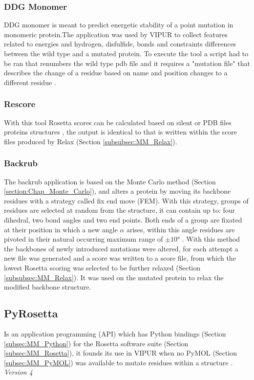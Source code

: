 \subsubsection{DDG Monomer}
DDG monomer is meant to predict energetic stability of a point mutation in  monomeric protein.The application was used by VIPUR to collect features related to energies and hydrogen, disfulfide, bonds and constraints differences between the wild type and a mutated protein. To execute the tool a script had to be ran that renumbers the wild type pdb file and it requires a "mutation file" that describes the change of a residue based on name and position changes to a different residue \cite{}.
\label{subsubsec:MM_DDG_Monomer}

\subsubsection{Rescore}
With this tool Rosetta scores can be calculated based on silent or PDB files proteins structures \cite{} , the output is identical to that is written within the score files produced by Relax (Section \ref{subsubsec:MM_Relax}).
\label{subsubsec:MM_Rescore}

\subsubsection{Backrub}
The backrub application is based on the Monte Carlo method (Section \ref{section:Chap_Monte_Carlo}), and alters a protein by moving its backbone residues with a strategy called fix end move (FEM). With this strategy, groups of residues are selected at random from the structure, it can contain up to: four dihedral, two bond angles and two end points. Both ends of a group are fixated at their position in which a new angle $\alpha$ arises, within this angle residues are pivoted in their natural occurring maximum range of $\pm \ang{10}$ \cite{}.
With this method the backbones of newly introduced mutations were altered, for each attempt a new file was generated and a score was written to a score file, from which the lowest Rosetta scoring was selected to be further relaxed (Section \ref{subsubsec:MM_Relax}).
It was used on the mutated protein to relax the modified backbone structure.
\label{subsubsec:MM_Backrub}

\subsection{PyRosetta}
Is an application programming (API) which has Python bindings (Section \ref{subsec:MM_Python}) for the Rosetta software suite (Section \ref{subsec:MM_Rosetta}), it founds its use in VIPUR when no PyMOL (Section \ref{subsec:MM_PyMOL}) was available to mutate residues within a structure \cite{}.
\label{subsec:MM_PyRosetta}
\newline
\textit{Version 4}

